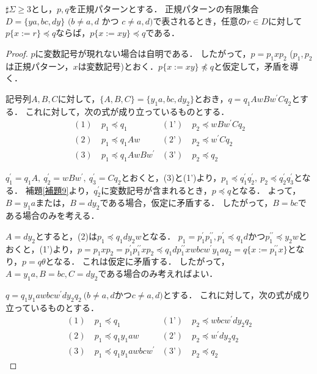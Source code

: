 
\begin{lem}\label{追加部分}
  $\sharp \Sigma \ge 3$とし，$p, q$を正規パターンとする．
  正規パターンの有限集合$D= \{ ya, bc, dy \}$ $(b \not = a,d$ かつ $c \not = a,d)$で表されるとき，任意の$r \in D$に対して$p \{ x := r \} \preceq q$ならば，$p \{ x := xy \} \preceq q$である．
  \end{lem}
  \begin{proof}
  $p$に変数記号が現れない場合は自明である．
  したがって，$p=p_{1}xp_{2}$ ($p_{1}, p_{2}$は正規パターン，$x$は変数記号)とおく．$p \{ x := xy \} \not \preceq q$と仮定して，矛盾を導く．
  
  記号列$A,B,C$に対して，$\{ A,B,C \} = \{ y_{1}a,bc,dy_{2} \}$とおき，$q=q_{1}AwBw^{\prime}Cq_{2}$とする．
  これに対して，次の式が成り立っているものとする．
  \begin{align*}
  (1)~& p_{1} \preceq q_{1} & (\text{1'})~& p_{2} \preceq wBw^{\prime}Cq_{2} \\
  (2)~& p_{1} \preceq q_{1}Aw & (\text{2'})~& p_{2} \preceq w^{\prime}Cq_{2} \\
  (3)~& p_{1} \preceq q_{1}AwBw^{\prime} & (\text{3'})~& p_{2} \preceq q_{2}
  \end{align*}
  
  $q^{\prime}_{1}=q_{1}A,~q^{\prime}_{2}=wBw^{\prime},~q^{\prime}_{3}=Cq_{2}$とおくと，(3)と(1')より，$p_{1} \preceq q^{\prime}_{1}q^{\prime}_{2},~p_{2} \preceq q^{\prime}_{2}q^{\prime}_{3}$となる．
  補題\ref{補題9}より，$q^{\prime}_{2}$に変数記号が含まれるとき，$p \preceq q$となる．
  よって，$B=y_{1}a$または，$B=dy_{2}$である場合，仮定に矛盾する．
  したがって，$B=bc$である場合のみを考える．
  
  $A=dy_{2}$とすると，(2)は$p_{1} \preceq q_{1}dy_{2}w$となる．
  $p_{1}=p^{\prime}_{1}p^{\prime\prime}_{1}, p^{\prime}_{1} \preceq q_{1}d$かつ$p^{\prime\prime}_{1} \preceq y_{2}w$とおくと，(1')より，$p=p_{1}xp_{2}=p^{\prime}_{1}p^{\prime\prime}_{1}xp_{2} \preceq q_{1}dp^{\prime\prime}_{1}xwbcw^{\prime}y_{1}aq_{2}=q \{ x:=p^{\prime\prime}_{1}x \}$となり，$p=q\theta$となる．
  これは仮定に矛盾する．
  したがって，$A=y_{1}a,B=bc,C=dy_{2}$である場合のみ考えればよい．
  
  $q=q_{1}y_{1}awbcw^{\prime}dy_{2}q_{2}~(b \not = a,d$かつ$c \not = a,d)$とする．
  これに対して，次の式が成り立っているものとする．
  \begin{align*}
  (1)~& p_{1} \preceq q_{1} & (\text{1'})~& p_{2} \preceq wbcw^{\prime}dy_{2}q_{2} \\
  (2)~& p_{1} \preceq q_{1}y_{1}aw & (\text{2'})~& p_{2} \preceq w^{\prime}dy_{2}q_{2} \\
  (3)~& p_{1} \preceq q_{1}y_{1}awbcw^{\prime} & (\text{3'})~& p_{2} \preceq q_{2}
  \end{align*}
  

\end{proof}
